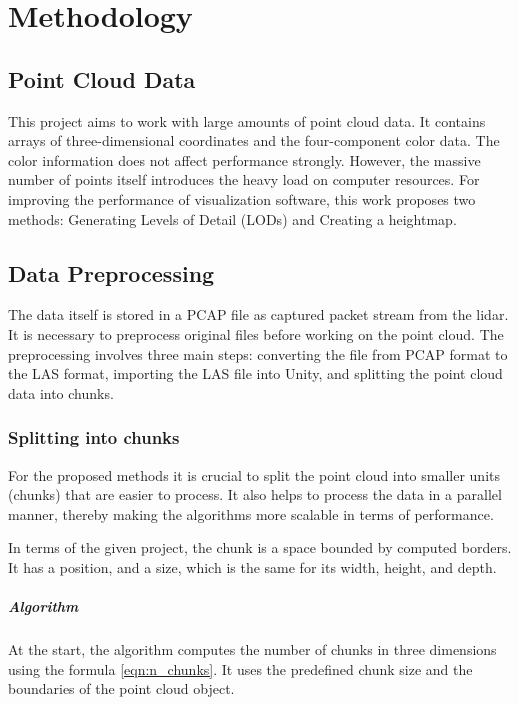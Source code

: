 \chapter{Methodology}
\label{chap:methodology}

\graphicspath{{figs/methodology/}}

\section{Point Cloud Data}
\label{sec:point_cloud_data}

This project aims to work with large amounts of point cloud data. It contains arrays of three-dimensional coordinates and the four-component color data. The color information does not affect performance strongly. However, the massive number of points itself introduces the heavy load on computer resources. For improving the performance of visualization software, this work proposes two methods: Generating Levels of Detail (LODs) and Creating a heightmap.


\section{Data Preprocessing}
\label{sec:data_preprocessing}

The data itself is stored in a PCAP file as captured packet stream from the lidar. It is necessary to preprocess original files before working on the point cloud. The preprocessing involves three main steps: converting the file from PCAP format to the LAS format, importing the LAS file into Unity, and splitting the point cloud data into chunks.

\subsection{Splitting into chunks}

For the proposed methods it is crucial to split the point cloud into smaller units (chunks) that are easier to process. It also helps to process the data in a parallel manner, thereby making the algorithms more scalable in terms of performance.

In terms of the given project, the chunk is a space bounded by computed borders. It has a position, and a size, which is the same for its width, height, and depth. 

\paragraph{Algorithm}
At the start, the algorithm computes the number of chunks in three dimensions using the formula \ref{eqn:n_chunks}. It uses the predefined chunk size and the boundaries of the point cloud object.

